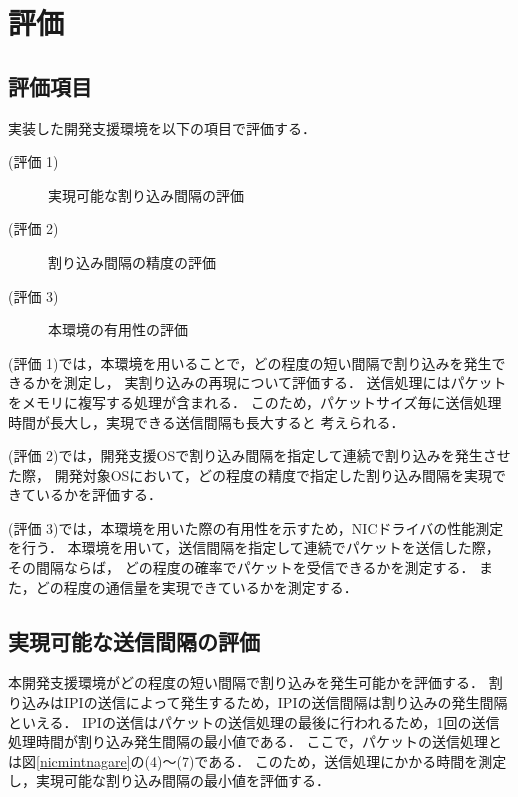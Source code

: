 \documentclass[submit,techreq,noauthor,dvipdfmx]{ipsj}
\begin{document}
\section{評価}\label{chap:evaluation}

\subsection{評価項目}\label{sec:item-of-evaluation}

実装した開発支援環境を以下の項目で評価する．
\begin{description}
    \item[(評価 1)]実現可能な割り込み間隔の評価
    \item[(評価 2)]割り込み間隔の精度の評価
    \item[(評価 3)]本環境の有用性の評価
\end{description}

(評価 1)では，本環境を用いることで，どの程度の短い間隔で割り込みを発生できるかを測定し，
実割り込みの再現について評価する．
送信処理にはパケットをメモリに複写する処理が含まれる．
このため，パケットサイズ毎に送信処理時間が長大し，実現できる送信間隔も長大すると
考えられる．

(評価 2)では，開発支援OSで割り込み間隔を指定して連続で割り込みを発生させた際，
開発対象OSにおいて，どの程度の精度で指定した割り込み間隔を実現できているかを評価する．

(評価 3)では，本環境を用いた際の有用性を示すため，NICドライバの性能測定を行う．
本環境を用いて，送信間隔を指定して連続でパケットを送信した際，その間隔ならば，
どの程度の確率でパケットを受信できるかを測定する．
また，どの程度の通信量を実現できているかを測定する．

\subsection{実現可能な送信間隔の評価}\label{sec:interval}

本開発支援環境がどの程度の短い間隔で割り込みを発生可能かを評価する．
割り込みはIPIの送信によって発生するため，IPIの送信間隔は割り込みの発生間隔といえる．
IPIの送信はパケットの送信処理の最後に行われるため，1回の送信処理時間が割り込み発生間隔の最小値である．
ここで，パケットの送信処理とは図\ref{nicmintnagare}の(4)〜(7)である．
このため，送信処理にかかる時間を測定し，実現可能な割り込み間隔の最小値を評価する．
\end{document}
